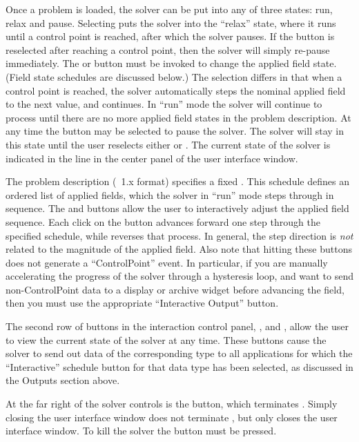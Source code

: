 Once a problem is loaded, the solver can be put into any of three
states: run, relax and pause.  Selecting  puts the solver
into the ``relax'' state, where it runs until a control point is
reached, after which the solver pauses.  If the  button is
reselected after reaching a control point, then the solver will simply
re-pause immediately.  The  or  button must be
invoked to change the applied field state. (Field state schedules are
discussed below.)  The  selection differs in that when a
control point is reached, the solver automatically steps the nominal
applied field to the next value, and continues.  In ``run'' mode the
solver will continue to process until there are no more applied field
states in the problem description.  At any time the  button
may be selected to pause the solver.  The solver will stay in this state
until the user reselects either  or .  The current
state of the solver is indicated in the  line in the center
panel of the user interface window.

The problem description (\MIF~1.x format)
specifies a fixed .  This schedule defines an
ordered list of applied fields, which the solver in ``run'' mode steps
through in sequence.  The  and  buttons allow
the user to interactively adjust the applied field sequence.  Each click
on the
 button advances forward one step through the specified
schedule, while  reverses that process.  In general, the
step direction is {\em not} related to the magnitude of the applied
field.  Also note that hitting these buttons does not generate a
``ControlPoint'' event.  In particular, if you are manually accelerating
the progress of the solver through a hysteresis loop, and want to send
non-ControlPoint data to a display or archive widget before advancing
the field, then you must use the appropriate ``Interactive Output''
button.

The second row of buttons in the interaction control panel,
,  and , allow the
user to view the current state of the solver at any time.  These buttons
cause the solver to send out data of the corresponding type to all
applications for which the ``Interactive'' schedule button for that
data type has been selected, as discussed in the Outputs section above.

At the far right of the solver controls is the  button, which
terminates .  Simply
closing the user interface window does not terminate ,
but only closes the user interface window.  To kill the solver the
 button must be pressed.

